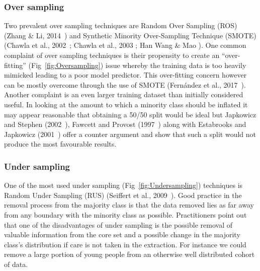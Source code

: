 \subsubsection{Over sampling}\label{subsec:OverSampling}
Two prevalent over sampling techniques are Random Over Sampling (ROS) (Zhang \& Li, 2014~\cite{zhang2014rwo}) and Synthetic Minority Over-Sampling Technique (SMOTE)  (Chawla et al., 2002~\cite{chawla2002smote}; Chawla et al., 2003 \cite{chawla2003smoteboost}; Han Wang \& Mao \cite{han2005borderline}). One common complaint of over sampling techniques is their propensity to create an ``over-fitting'' (Fig~\ref{fig:Oversampling}) issue whereby the training data is too heavily mimicked leading to a poor model predictor. This over-fitting concern however can be mostly overcome through the use of SMOTE (Fern\'{a}ndez et al., 2017~\cite{fernandez2017insight}). Another complaint is an even larger training dataset than initially considered useful. In looking at the amount to which a minority class should be inflated it may appear reasonable that obtaining a 50/50 split would be ideal but Japkowicz and Stephen (2002~\cite{Japkowicz2002}), Fawcett and Provost (1997~\cite{fawcett1997adaptive}) along with Estabrooks and Japkowicz (2001~\cite{estabrooks2001mixture}) offer a counter argument and show that such a split would not produce the most favourable results.



\subsubsection{Under sampling}\label{subsec:UnderSampling}
One of the most used under sampling (Fig~\ref{fig:Undersampling}) techniques is Random Under Sampling (RUS) (Seiffert et al., 2009~\cite{seiffert2009rusboost}). Good practice in the removal process from the majority class is that the data removed lies as far away from any boundary with the minority class as possible. Practitioners point out that one of the disadvantages of under sampling is the possible removal of valuable information from the core set and a possible change in the majority class's distribution if care is not taken in the extraction. For instance we could remove a large portion of young people from an otherwise well distributed cohort of data.



